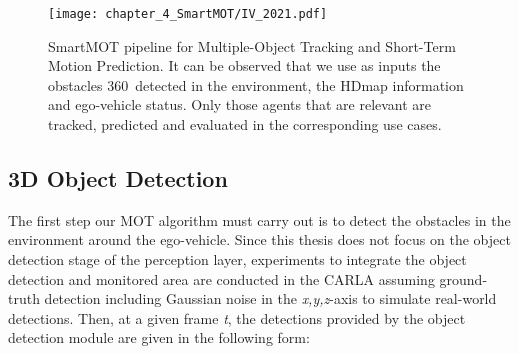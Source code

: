 \begin{figure}[h]
	\centering
	\texttt{[image: chapter\_4\_SmartMOT/IV\_2021.pdf]}
	\captionsetup{justification=justified}
	\caption[SmartMOT pipeline for Multiple-Object Tracking and Short-Term Motion Prediction]{SmartMOT pipeline for Multiple-Object Tracking and Short-Term Motion Prediction. It can be observed that we use as inputs the obstacles 360\degree~detected in the environment, the \ac{HDmap} information and ego-vehicle status. Only those agents that are relevant are tracked, predicted and evaluated in the corresponding use cases.}
	\label{fig:chapter_4_SmartMOT/IV_2021}
\end{figure}

\subsection{3D Object Detection}
\label{subsec:4_smartmot_detection}

The first step our \ac{MOT} algorithm must carry out is to detect the obstacles in the environment around the ego-vehicle. Since this thesis does not focus on the object detection stage of the perception layer, experiments to integrate the object detection and monitored area are conducted in the \ac{CARLA} assuming ground-truth detection including Gaussian noise in the \textit{x,y,z}-axis to simulate real-world detections. Then, at a given frame \textit{t}, the detections provided by the object detection module are given in the following form:

